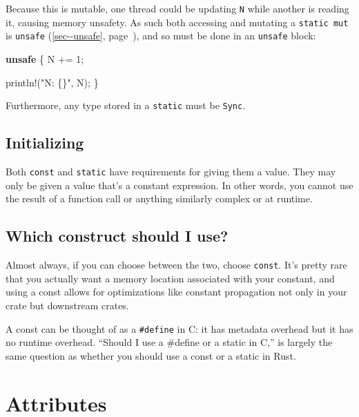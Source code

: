 \documentclass[a4paper,]{book}
\renewcommand*{\hyperref}[2][\ar]{%
  \def\ar{#2}%
  #2 (\autoref{#1}, page~\pageref{#1})}
\newenvironment{Shaded}{\begin{snugshade}}{\end{snugshade}}
\newcommand{\KeywordTok}[1]{\textcolor[rgb]{0.13,0.29,0.53}{\textbf{{#1}}}}
\newcommand{\DecValTok}[1]{\textcolor[rgb]{0.00,0.00,0.81}{{#1}}}
\newcommand{\StringTok}[1]{\textcolor[rgb]{0.31,0.60,0.02}{{#1}}}
\newcommand{\OtherTok}[1]{\textcolor[rgb]{0.56,0.35,0.01}{{#1}}}
\newcommand{\NormalTok}[1]{{#1}}
\begin{document}
Because this is mutable, one thread could be updating \texttt{N} while
another is reading it, causing memory unsafety. As such both accessing
and mutating a \texttt{static\ mut} is
\hyperref[sec--unsafe]{\texttt{unsafe}}, and so must be done in an
\texttt{unsafe} block:

\begin{Shaded}
\begin{Highlighting}[]

\KeywordTok{unsafe} \NormalTok{\{}
    \NormalTok{N += }\DecValTok{1}\NormalTok{;}

    \OtherTok{println!}\NormalTok{(}\StringTok{"N: \{\}"}\NormalTok{, N);}
\NormalTok{\}}
\end{Highlighting}
\end{Shaded}

Furthermore, any type stored in a \texttt{static} must be \texttt{Sync}.

\subsection{Initializing}\label{initializing}

Both \texttt{const} and \texttt{static} have requirements for giving
them a value. They may only be given a value that's a constant
expression. In other words, you cannot use the result of a function call
or anything similarly complex or at runtime.

\subsection{Which construct should I
use?}\label{which-construct-should-i-use}

Almost always, if you can choose between the two, choose \texttt{const}.
It's pretty rare that you actually want a memory location associated
with your constant, and using a const allows for optimizations like
constant propagation not only in your crate but downstream crates.

A const can be thought of as a \texttt{\#define} in C: it has metadata
overhead but it has no runtime overhead. ``Should I use a \#define or a
static in C,'' is largely the same question as whether you should use a
const or a static in Rust.

\section{Attributes}\label{sec--attributes}
\end{document}
